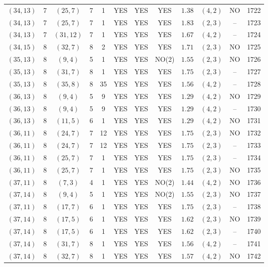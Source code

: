 \begin{longtable}{|c|c|c|c|c|c|c|c|c|c|c|c|}
$(34,13)$ & 7 & $(25,7)$ & 7 & 1 & YES & YES & YES & $1.38$ & $(4,2)$ & NO & 1722\\
$(34,13)$ & 7 & $(25,7)$ & 7 & 1 & YES & YES & YES & $1.83$ & $(2,3)$ & -- & 1723\\
$(34,13)$ & 7 & $(31,12)$ & 7 & 1 & YES & YES & YES & $1.67$ & $(4,2)$ & -- & 1724\\
$(34,15)$ & 8 & $(32,7)$ & 8 & 2 & YES & YES & YES & $1.71$ & $(2,3)$ & NO & 1725\\
$(35,13)$ & 8 & $(9,4)$ & 5 & 1 & YES & YES & NO(2) & $1.55$ & $(2,3)$ & NO & 1726\\
$(35,13)$ & 8 & $(31,7)$ & 8 & 1 & YES & YES & YES & $1.75$ & $(2,3)$ & -- & 1727\\
$(35,13)$ & 8 & $(35,8)$ & 8 & 35 & YES & YES & YES & $1.56$ & $(4,2)$ & -- & 1728\\
$(36,13)$ & 8 & $(9,4)$ & 5 & 9 & YES & YES & YES & $1.29$ & $(4,2)$ & NO & 1729\\
$(36,13)$ & 8 & $(9,4)$ & 5 & 9 & YES & YES & YES & $1.29$ & $(4,2)$ & -- & 1730\\
$(36,13)$ & 8 & $(11,5)$ & 6 & 1 & YES & YES & YES & $1.29$ & $(4,2)$ & NO & 1731\\
$(36,11)$ & 8 & $(24,7)$ & 7 & 12 & YES & YES & YES & $1.75$ & $(2,3)$ & NO & 1732\\
$(36,11)$ & 8 & $(24,7)$ & 7 & 12 & YES & YES & YES & $1.75$ & $(2,3)$ & -- & 1733\\
$(36,11)$ & 8 & $(25,7)$ & 7 & 1 & YES & YES & YES & $1.75$ & $(2,3)$ & -- & 1734\\
$(36,11)$ & 8 & $(25,7)$ & 7 & 1 & YES & YES & YES & $1.75$ & $(2,3)$ & NO & 1735\\
$(37,11)$ & 8 & $(7,3)$ & 4 & 1 & YES & YES & NO(2) & $1.44$ & $(4,2)$ & NO & 1736\\
$(37,14)$ & 8 & $(9,4)$ & 5 & 1 & YES & YES & NO(2) & $1.55$ & $(2,3)$ & NO & 1737\\
$(37,11)$ & 8 & $(17,7)$ & 6 & 1 & YES & YES & YES & $1.75$ & $(2,3)$ & -- & 1738\\
$(37,14)$ & 8 & $(17,5)$ & 6 & 1 & YES & YES & YES & $1.62$ & $(2,3)$ & NO & 1739\\
$(37,14)$ & 8 & $(17,5)$ & 6 & 1 & YES & YES & YES & $1.62$ & $(2,3)$ & -- & 1740\\
$(37,14)$ & 8 & $(31,7)$ & 8 & 1 & YES & YES & YES & $1.56$ & $(4,2)$ & -- & 1741\\
$(37,14)$ & 8 & $(32,7)$ & 8 & 1 & YES & YES & YES & $1.57$ & $(4,2)$ & NO & 1742\\

\end{longtable}
